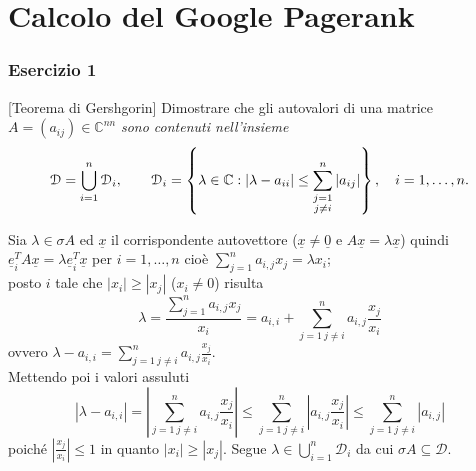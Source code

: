 \chapter{Calcolo del Google Pagerank}
\label{chap:Google}

\subsection{Esercizio 1}
\label{sub:Es1}
[Teorema di Gershgorin]
      Dimostrare che gli autovalori di una matrice
      $A=(a_{ij})\in\mathbb{C}^{n n}$
      \emph{sono contenuti nell'insieme}
			\[
				\mathcal{D}=\bigcup_{i=1}^n\mathcal{D}_i,\qquad \mathcal{D}_i=\left\{\lambda\in\mathbb{C}:|\lambda-a_{ii}|\leq\sum_{\begin{subarray}{c}
					j=1\\
					j\neq i
				\end{subarray}}^n|a_{ij}|\right\},\quad i=1,\dots,n.
			\]
\begin{sol}
   Sia $\lambda\in\sigma{A}$ ed $\underline{x}$ il corrispondente autovettore ($\underline{x}\neq\underline{0}$
   e $A\underline{x}=\lambda\underline{x}$) quindi $\underline{e}_i^TA\underline{x}=\lambda\underline{e}_i^T\underline{x}$
   per $i=1,\ldots,n$ cioè $\sum_{j=1}^n{a_{i,j}x_j}=\lambda x_i$;\\
   posto $i$ tale che $|x_i|\geq|x_j|$ ($x_i\neq 0$)
   risulta $$\lambda=\frac{\sum_{j=1}^n{a_{i,j}x_j}}{x_i}=a_{i,i}+\sum_{j=1\: j\neq i}^n{a_{i,j}\frac{x_j}{x_i}}$$ ovvero
   $\lambda-a_{i,i}=\sum_{j=1\: j\neq i}^n{a_{i,j}\frac{x_j}{x_i}}$.\\
   Mettendo poi i valori assuluti
   $$\left|\lambda-a_{i,i}\right|=\left|\sum_{j=1\: j\neq i}^n{a_{i,j}\frac{x_j}{x_i}}\right|\leq\sum_{j=1\: j\neq i}^n{\left|a_{i,j}\frac{x_j}{x_i}\right|}\leq\sum_{j=1\: j\neq i}^n{\left|a_{i,j}\right|}$$ poiché $\left|\frac{x_j}{x_i}\right|\leq 1$
   in quanto $|x_i|\geq|x_j|$. Segue $\lambda\in\bigcup_{i=1}^{n}{\mathcal{D}_i}$ da cui $\sigma{A}\subseteq\mathcal{D}$.
\end{sol}
